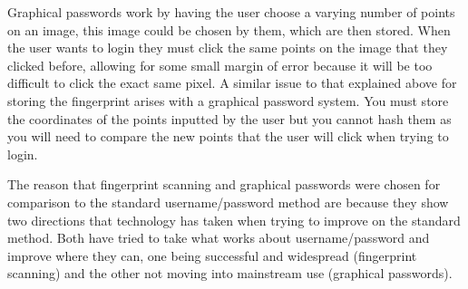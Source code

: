 \documentclass{ueacmpstyle}
\begin{document}
    Graphical passwords work by having the user choose a varying number of points on an image, 
    this image could be chosen by them, which are then stored. When the user wants to login 
    they must click the same points on the image that they clicked before, allowing for some 
    small margin of error because it will be too difficult to click the exact same pixel. 
    A similar issue to that explained above for storing the fingerprint arises with a 
    graphical password system. You must store the coordinates of the points inputted by the 
    user but you cannot hash them as you will need to compare the new points that the user 
    will click when trying to login.

    The reason that fingerprint scanning and graphical passwords were chosen for comparison 
    to the standard username/password method are because they show two directions that 
    technology has taken when trying to improve on the standard method. Both have tried to 
    take what works about username/password and improve where they can, one being successful 
    and widespread (fingerprint scanning) and the other not moving into mainstream use 
    (graphical passwords).
\end{document}
